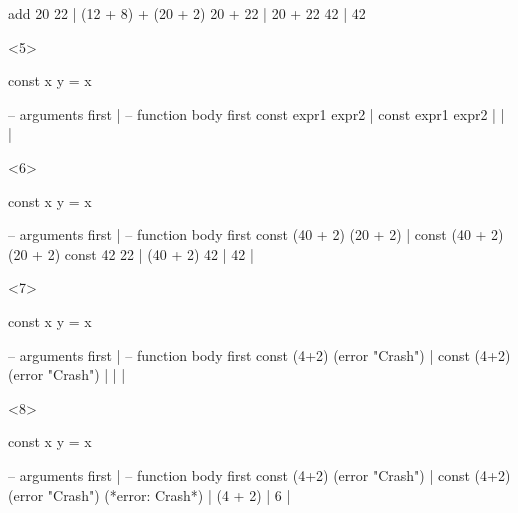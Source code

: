 \documentclass[17pt]{beamer}
\renewcommand{\(}[1]{\begin{columns}[#1]}
\renewcommand{\)}{\end{columns}}
\newcommand{\<}[1]{\begin{column}{#1}}
\renewcommand{\>}{\end{column}}
\begin{document}
\begin{frame}[fragile]
\begin{minipage}[c][.5\textheight]{\textwidth}
\begin{center}
\begin{onlyenv}
\begin{code}[eval]
add 20 22                   | (12 + 8) + (20 + 2)
20 + 22                     | 20 + 22
42                          | 42
      \end{code}
    \end{onlyenv}
    \begin{onlyenv}<5>
      \begin{code}
const x y = x
      \end{code}
      \begin{code}[eval]
-- arguments first          | -- function body first
const expr1 expr2           | const expr1 expr2
                            |
                            |
                            |
      \end{code}
    \end{onlyenv}
    \begin{onlyenv}<6>
      \begin{code}
const x y = x
      \end{code}
      \begin{code}[eval]
-- arguments first          | -- function body first
const (40 + 2) (20 + 2)     | const (40 + 2) (20 + 2)
const 42 22                 | (40 + 2)
42                          | 42
                            |
      \end{code}
    \end{onlyenv}
    \begin{onlyenv}<7>
      \begin{code}
const x y = x
      \end{code}
      \begin{code}[eval]
-- arguments first          | -- function body first
const (4+2) (error "Crash") | const (4+2) (error "Crash")
                            |
                            |
                            |
      \end{code}
    \end{onlyenv}
    \begin{onlyenv}<8>
      \begin{code}
const x y = x
      \end{code}
      \begin{code}[eval]
-- arguments first          | -- function body first
const (4+2) (error "Crash") | const (4+2) (error "Crash")
(*\color{red}error: Crash*)               | (4 + 2)
                            | 6
                            |
      \end{code}
    \end{onlyenv}
  \end{center}
  \end{minipage}
\end{frame}
\end{document}
